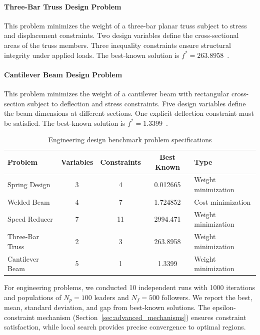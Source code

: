 \documentclass[11pt]{article}
\begin{document}
\paragraph{Three-Bar Truss Design Problem} This problem minimizes the weight of a three-bar planar truss subject to stress and displacement constraints. Two design variables define the cross-sectional areas of the truss members. Three inequality constraints ensure structural integrity under applied loads. The best-known solution is $f^* = 263.8958$~\citep{ray2001society}.

\paragraph{Cantilever Beam Design Problem} This problem minimizes the weight of a cantilever beam with rectangular cross-section subject to deflection and stress constraints. Five design variables define the beam dimensions at different sections. One explicit deflection constraint must be satisfied. The best-known solution is $f^* = 1.3399$~\citep{mirjalili2017salp}.

\begin{table}[ht]
\centering
\caption{Engineering design benchmark problem specifications}
\label{tab:engineering_specs}
\small
\begin{tabular}{@{}lcccl@{}}
\toprule
Problem & Variables & Constraints & Best Known & Type \\
\midrule
Spring Design & 3 & 4 & 0.012665 & Weight minimization \\
Welded Beam & 4 & 7 & 1.724852 & Cost minimization \\
Speed Reducer & 7 & 11 & 2994.471 & Weight minimization \\
Three-Bar Truss & 2 & 3 & 263.8958 & Weight minimization \\
Cantilever Beam & 5 & 1 & 1.3399 & Weight minimization \\
\bottomrule
\end{tabular}
\end{table}

For engineering problems, we conducted 10 independent runs with 1000 iterations and populations of $N_p = 100$ leaders and $N_f = 500$ followers. We report the best, mean, standard deviation, and gap from best-known solutions. The epsilon-constraint mechanism (Section~\ref{sec:advanced_mechanisms}) ensures constraint satisfaction, while local search provides precise convergence to optimal regions.
\end{document}
